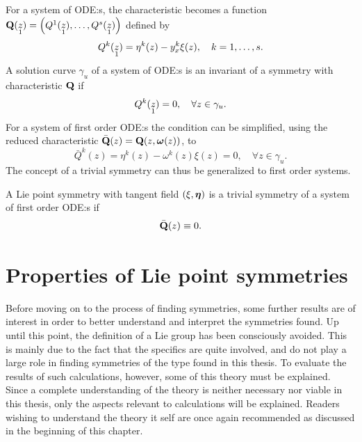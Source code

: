 For a system of ODE:s, the characteristic becomes a function \(\vb{Q}(\prolong{z}{1}) = \qty(Q^1(\prolong{z}{1}), \dots, Q^s(\prolong{z}{1}))\) defined by
\begin{equation}
  Q^k(\prolong{z}{1}) = \eta^k(z) - y^k_x \xi(z), \quad k = 1,\dots,s.
\end{equation}
A solution curve \(\gamma_u\) of a system of ODE:s is an invariant of a symmetry with characteristic \(\vb{Q}\) if
\begin{equation}
  Q^k(\prolong{z}{1}) = 0, \quad \forall z \in \gamma_u.
\end{equation}
For a system of first order ODE:s  the condition can be simplified, using the reduced characteristic \(\bar{\vb{Q}}(z) = \vb{Q}(z, \vb*{\omega}(z))\), to
\begin{equation}
  \bar{Q}^k(z) = \eta^k(z) - \omega^k(z) \xi(z) = 0, \quad \forall z \in \gamma_u.
\end{equation}
The concept of a trivial symmetry can thus be generalized to first order systems.
\begin{defn} \label{defn:trivial-symmetry}
  A Lie point symmetry with tangent field \(\left(\xi, \vb*{\eta}\right)\) is a trivial symmetry of a system of first order ODE:s  if
  \begin{equation}
    \bar{\vb{Q}}(z) \equiv 0.
  \end{equation}
\end{defn}

\section{Properties of Lie point symmetries} \label{sec:lie-point-properties}

Before moving on to the process of finding symmetries, some further results are of interest in order to better understand and interpret the symmetries found.
Up until this point, the definition of a Lie group has been consciously avoided.
This is mainly due to the fact that the specifics are quite involved, and do not play a large role in finding symmetries of the type found in this thesis.
To evaluate the results of such calculations, however, some of this theory must be explained.
Since a complete understanding of the theory is neither necessary nor viable in this thesis, only the aspects relevant to calculations will be explained.
Readers wishing to understand the theory it self are once again recommended \cite{olver1993applications,olver1995equivalence} as discussed in the beginning of this chapter.

